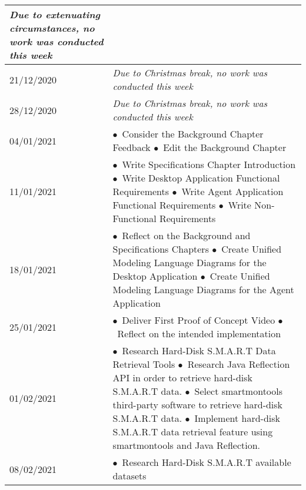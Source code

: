\begin{longtable}{
|p{}%
|p{}|%
}
    \indent \textit{Due to extenuating circumstances, no work was conducted this week}
    \\ \hline
    21/12/2020                 &
    \indent \textit{Due to Christmas break, no work was conducted this week}
    \\ \hline
    28/12/2020                 &
    \indent \textit{Due to Christmas break, no work was conducted this week}
    \\ \hline
    04/01/2021                 &
    \indent$\bullet$\ Consider the Background Chapter Feedback \newline
    \indent$\bullet$\ Edit the Background Chapter
    \\ \hline
    11/01/2021                 &
    \indent$\bullet$\ Write Specifications Chapter Introduction \newline
    \indent$\bullet$\ Write Desktop Application Functional Requirements\newline
    \indent$\bullet$\ Write Agent Application Functional Requirements\newline
    \indent$\bullet$\ Write Non-Functional Requirements
    \\ \hline
    18/01/2021                 &
    \indent$\bullet$\ Reflect on the Background and Specifications Chapters \newline
    \indent$\bullet$\ Create Unified Modeling Language Diagrams for the Desktop Application \newline
    \indent$\bullet$\ Create Unified Modeling Language Diagrams for the Agent Application
    \\ \hline
    25/01/2021                 &
    \indent$\bullet$\ Deliver First Proof of Concept Video \newline
    \indent$\bullet$\ Reflect on the intended implementation
    \\ \hline
    01/02/2021                 &
    \indent$\bullet$\ Research Hard-Disk S.M.A.R.T Data Retrieval Tools \newline
    \indent$\bullet$\ Research Java Reflection API in order to retrieve hard-disk S.M.A.R.T data. \newline
    \indent$\bullet$\ Select smartmontools third-party software to retrieve hard-disk S.M.A.R.T data. \newline
    \indent$\bullet$\ Implement hard-disk S.M.A.R.T data retrieval feature using smartmontools and Java Reflection.
    \\ \hline
    08/02/2021                 &
    \indent$\bullet$\ Research Hard-Disk S.M.A.R.T available datasets \newline

\end{longtable}
